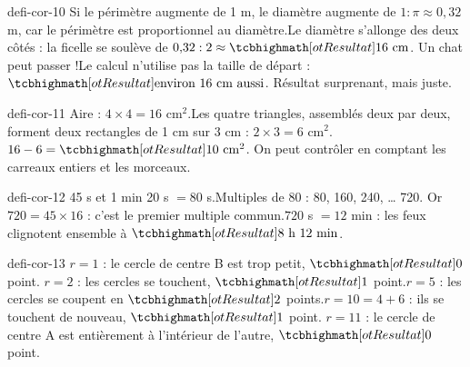 \begin{blocEdition}{defi-cor-10}
Si le périmètre augmente de 1 m, le diamètre augmente de $1:\pi\approx0{,}32$ m, car le périmètre est proportionnel au diamètre.Le diamètre s’allonge des deux côtés : la ficelle se soulève de $0{,}32:2\approx\res{16\ \mathrm{cm}}$. Un chat peut passer !Le calcul n’utilise pas la taille de départ : $\res{\text{environ 16 cm aussi}}$. Résultat surprenant, mais juste.
\end{blocEdition}
\begin{blocEdition}{defi-cor-11}
Aire : $4\times4=16$ cm$^2$.Les quatre triangles, assemblés deux par deux, forment deux rectangles de 1 cm sur 3 cm : $2\times3=6$ cm$^2$.$16-6=\res{10\ \mathrm{cm}^2}$. On peut contrôler en comptant les carreaux entiers et les morceaux.\label{fig-defi-cor-11}

\end{blocEdition}
\begin{blocEdition}{defi-cor-12}
45 s et 1 min 20 s $=80$ s.Multiples de 80 : 80, 160, 240, … 720. Or $720=45\times16$ : c’est le premier multiple commun.$720$ s $=12$ min : les feux clignotent ensemble à $\res{8\text{ h }12\text{ min}}$.
\end{blocEdition}
\begin{blocEdition}{defi-cor-13}
$r=1$ : le cercle de centre B est trop petit, $\res0$ point. $r=2$ : les cercles se touchent, $\res1$ point.$r=5$ : les cercles se coupent en $\res2$ points.$r=10=4+6$ : ils se touchent de nouveau, $\res1$ point. $r=11$ : le cercle de centre A est entièrement à l’intérieur de l’autre, $\res0$ point.\label{fig-defi-cor-13}

\end{blocEdition}
